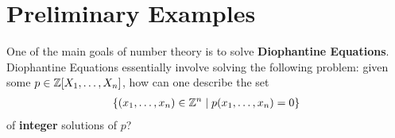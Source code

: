 \chapter{Preliminary Examples}\label{Ch1:CH}
\thispagestyle{empty}

One of the main goals of number theory is to solve \textbf{Diophantine Equations}. Diophantine Equations essentially involve solving the following problem: given some $p \in \mathbb{Z}\!\left[ X_1, \ldots, X_n \right]$, how can one describe the set
\begin{align*}
    \left\{ \left( x_1, \ldots, x_n \right) \in \mathbb{Z}^n \; \middle\vert \; p\!\left( x_1, \ldots, x_n \right) = 0 \right\}
\end{align*}
of \textbf{integer} solutions of $p$?



% 
% 